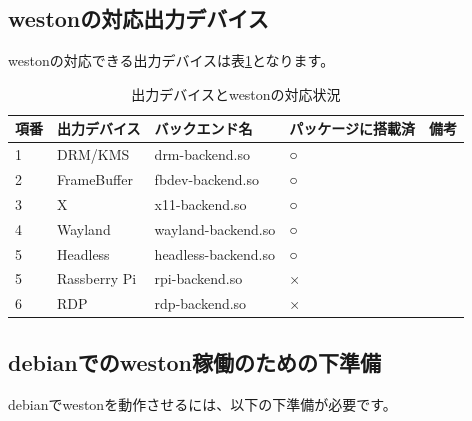 \documentclass[mingoth,a4paper]{jsarticle}
\begin{document}
\subsection{westonの対応出力デバイス}

 westonの対応できる出力デバイスは表\ref{tab:debian-weston-backends}となります。

\begin{table}[ht]
\begin{center}
\begin{tabular}{|l|p{4cm}|p{4cm}|p{3cm}|l|}
\hline 
項番&出力デバイス&バックエンド名&パッケージに搭載済&備考\\
\hline \hline
1& DRM/KMS & drm-backend.so & ○ & \\
2& FrameBuffer & fbdev-backend.so & ○ & \\
3& X & x11-backend.so & ○ & \\
4& Wayland & wayland-backend.so & ○ & \\
5& Headless & headless-backend.so & ○ & \\
5& Rassberry Pi & rpi-backend.so & × & \\
6& RDP & rdp-backend.so & × & \\
\hline
\end{tabular}
\label{tab:debian-weston-backends}
\caption{出力デバイスとwestonの対応状況}
\end{center}
\end{table}

\subsection{debianでのweston稼働のための下準備}
\label{sec:pre-requisite}
debianでwestonを動作させるには、以下の下準備が必要です。
\end{document}
